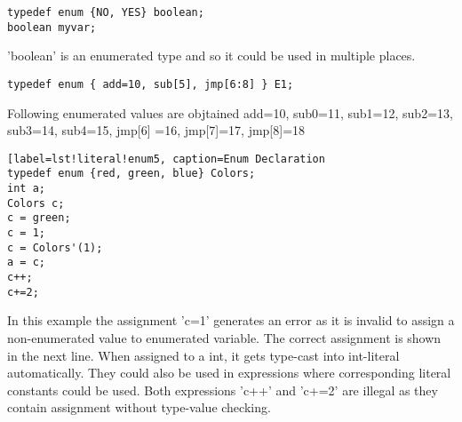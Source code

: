 \begin{lstlisting}[label=lst!literal!enum4, caption=Enum Declaration
    Examples]
typedef enum {NO, YES} boolean;
boolean myvar;
\end{lstlisting}

'boolean' is an enumerated type and so it could be used in multiple
places.

\begin{lstlisting}[label=lst!literal!enum5, caption=Enum Declaration
    Examples]
typedef enum { add=10, sub[5], jmp[6:8] } E1;
\end{lstlisting}

Following enumerated values are objtained {add=10, sub0=11, sub1=12,
  sub2=13, sub3=14, sub4=15, jmp[6] =16, jmp[7]=17, jmp[8]=18}

\begin{lstlisting}[label=lst!literal!enum5, caption=Enum Declaration
typedef enum {red, green, blue} Colors;
int a;
Colors c;
c = green;
c = 1;
c = Colors'(1);
a = c;
c++;
c+=2;
\end{lstlisting}

In this example the assignment 'c=1' generates an error as it is
invalid to assign a non-enumerated value to enumerated variable. The
correct assignment is shown in the next line. When assigned to a int,
it gets type-cast into int-literal automatically. They could also be
used in expressions where corresponding literal constants could be
used.  Both expressions 'c++' and 'c+=2' are illegal as they contain
assignment without type-value checking.

